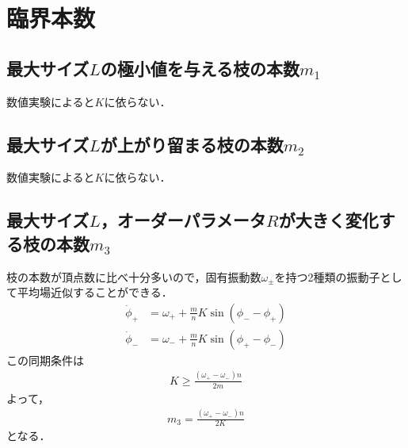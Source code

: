 \documentclass[../main]{subfiles}
\begin{document}
\section{臨界本数}
\subsection{最大サイズ$L$の極小値を与える枝の本数$m_1$}
数値実験によると$K$に依らない．
\subsection{最大サイズ$L$が上がり留まる枝の本数$m_2$}
数値実験によると$K$に依らない．
\subsection{最大サイズ$L$，オーダーパラメータ$R$が大きく変化する枝の本数$m_3$}
枝の本数が頂点数に比べ十分多いので，固有振動数$\omega_\pm$を持つ2種類の振動子として平均場近似することができる．
\begin{align*}
    \dot{\phi}_+&=\omega_++\frac{m}{n}K\sin(\phi_--\phi_+)\\
    \dot{\phi}_-&=\omega_-+\frac{m}{n}K\sin(\phi_+-\phi_-)
\end{align*}
この同期条件は
\begin{align*}
    K\geq \frac{(\omega_+-\omega_-)n}{2m}
\end{align*}
よって，
\begin{align*}
    m_3=\frac{(\omega_+-\omega_-)n}{2K}
\end{align*}
となる．
\end{document}
